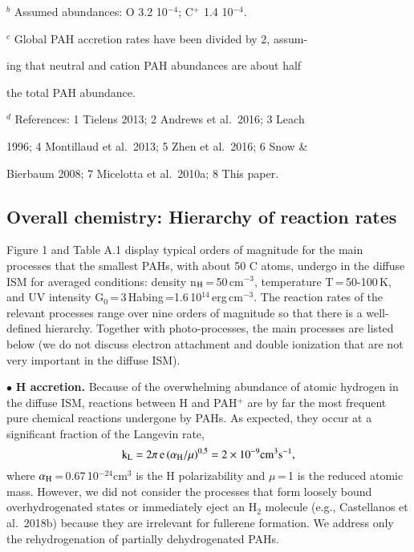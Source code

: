 \documentclass{aa}
\begin{document}
\begin{table}[htbp]
{\begin{list}{}{}
\item[$^{b}$ Assumed abundances: O 3.2 10$^{-4}$; C$^+$ 1.4 10$^{-4}$.]
\item[$^{c}$ Global PAH accretion rates have been divided by 2, assum-]
\item[ing that neutral and cation PAH abundances are about half] 
\item[the total PAH abundance.]
\item[$^d$ References: 1 Tielens 2013; 2 Andrews et al.\  2016; 3 Leach]
\item[1996; 4 Montillaud et al.\ 2013; 5 Zhen et al.\ 2016; 6 Snow] \& \item[Bierbaum 2008; 7 Micelotta et al.\ 2010a; 8 This paper.]
\end{list}}
\end{table}

\subsection{Overall chemistry: Hierarchy of reaction rates}

Figure 1 and Table A.1 display typical orders of magnitude for the  main processes that the smallest PAHs, with about 50 C atoms, undergo in the diffuse ISM for averaged conditions: density n$_{\rm H}$\,=\,50\,cm$^{-3}$, temperature T\,=\,50-100\,K, and UV intensity G$_0$\,=\,3\,Habing\,=1.6\,10$^{14}$\,erg\,cm$^{-3}$. 
The reaction rates of the relevant processes range over nine orders of magnitude so that there is  a well-defined hierarchy.
Together with photo-processes, the main processes are listed below  (we do not discuss electron attachment and double ionization that are not very important in the diffuse ISM).


$\bullet$ {\bf H accretion.} 
Because of the overwhelming abundance of atomic hydrogen in the diffuse ISM, reactions between H and PAH$^+$ are by far the most frequent pure chemical reactions undergone by PAHs. As expected, they occur at a significant fraction of the Langevin rate, 
\begin{equation}
{\rm k_L = 2\pi\,e\,(\alpha_H/\mu )^{0.5} =  2\times 10^{-9} cm^3 s^{-1}}
,\end{equation}
where $\alpha_{\rm H}$\,=\,0.67\,10$^{-24}$cm$^3$ is the H polarizability and $\mu$\,=\,1 is the reduced atomic mass.  
However, we  did not consider the processes that form loosely bound overhydrogenated states or immediately eject an H$_2$ molecule (e.g., Castellanos et al.\ 2018b)  because they are irrelevant for fullerene formation. We address only the rehydrogenation of partially dehydrogenated PAHs. 
\end{document}
